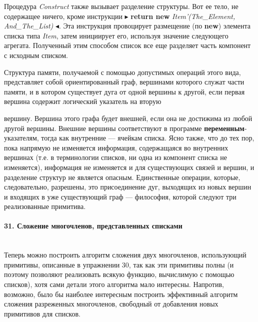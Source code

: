 \documentclass{../../template/mai_book}
\begin{document}
Процедура \textit{Construct} также вызывает разделение структуры. Вот ее тело, не содержащее ничего, кроме инструкции $\blacktriangleright$ \textbf{return new} \textit{Item'(\linebreak The\_Element, And\_The\_List)} $\blacktriangleleft$. Эта инструкция провоцирует размещение (по \textbf{new}) элемента списка типа \textit{Item}, затем инициирует его, используя значение следующего агрегата. Полученный этим способом список все еще разделяет часть компонент с исходным списком.

Структура памяти, получаемой с помощью допустимых операций этого вида, представляет собой ориентированный граф, вершинами которого служат части памяти, и в котором существует дуга от одной вершины к другой, если первая вершина содержит логический указатель на вторую \linebreak

\newpage


\noindent
вершину. Вершина этого графа будет внешней, если она не достижима из любой другой вершины. Внешние вершины соответствуют в программе \textbf{переменным}-указателям, тогда как внутренние — ячейкам списка. Ясно также, что до тех пор, пока напрямую не изменяется информация, содержащаяся во внутренних вершинах (т.е. в терминологии списков, ни одна из компонент списка не изменяется), информация не изменяется и для существующих связей и вершин, и разделение структур не является опасным. Единственные операции, которые, следовательно, разрешены, это присоединение дуг, выходящих из новых вершин и входящих в уже существующий граф — философия, которой следуют три реализованные примитива.

\paragraph{31. Сложение многочленов, представленных списками} \mbox{}\\

Теперь можно построить алгоритм сложения двух многочленов, использующий примитивы, описанные в упражнении 30, так как эти примитивы полны (и поэтому позволяют реализовать всякую функцию, вычислимую с помощью списков), хотя сами детали этого алгоритма мало интересны. Напротив, возможно, было бы наиболее интересным построить эффективный алгоритм сложения разреженных  многочленов, свободный от добавления новых примитивов для списков.
\end{document}
